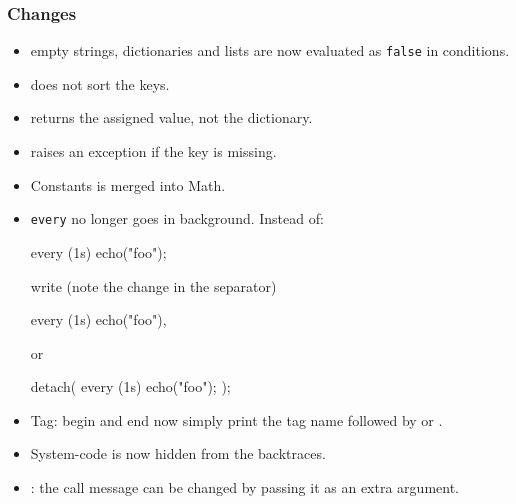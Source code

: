 \subsubsection{Changes}
\begin{itemize}
\item empty strings, dictionaries and lists are now evaluated as
  \lstinline{false} in conditions.
\item {} does not sort the keys.
\item {} returns the assigned value, not the
  dictionary.
\item {} raises an exception if the key is missing.
\item Constants is merged into Math.
\item \lstinline|every| no longer goes in background.  Instead of:

\begin{urbiunchecked}
every (1s) echo("foo");
\end{urbiunchecked}

  \noindent
  write (note the change in the separator)

\begin{urbiunchecked}
every (1s) echo("foo"),
\end{urbiunchecked}

  \noindent
  or

\begin{urbiunchecked}
detach({ every (1s) echo("foo"); });
\end{urbiunchecked}

\item Tag: begin and end now simply print the tag name followed by
   or .
\item System-code is now hidden from the backtraces.
\item {}: the call message can be changed by passing it
  as an extra argument.
\end{itemize}


